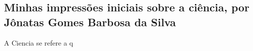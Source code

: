 \subsection{Minhas impressões iniciais sobre a ciência, por Jônatas Gomes Barbosa da Silva}

A \gls{Ciencia} se refere a q